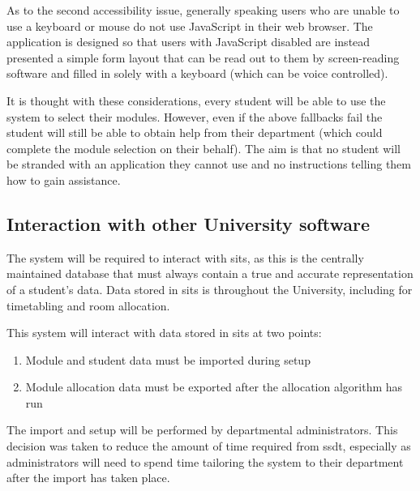 \documentclass[draft]{scrartcl}
\begin{document}

As to the second accessibility issue, generally speaking users who are unable
to use a keyboard or mouse do not use JavaScript in their web browser. The
application is designed so that users with JavaScript disabled are instead
presented a simple form layout that can be read out to them by screen-reading
software and filled in solely with a keyboard (which can be voice controlled).

It is thought with these considerations, every student will be able to use the
system to select their modules. However, even if the above fallbacks fail the
student will still be able to obtain help from their department (which could
complete the module selection on their behalf). The aim is that no student
will be stranded with an application they cannot use and no instructions
telling them how to gain assistance.


\subsection{Interaction with other University software}

The system will be required to interact with \gls{sits}, as this is the
centrally maintained database that must always contain a true and accurate
representation of a student's data. Data stored in \gls{sits} is throughout
the University, including for timetabling and room allocation.

This system will interact with data stored in \gls{sits} at two points:

\begin{enumerate}
  \item Module and student data must be imported during setup
  \item Module allocation data must be exported after the allocation algorithm has run
\end{enumerate}

The import and setup will be performed by departmental administrators. This
decision was taken to reduce the amount of time required from \gls{ssdt},
especially as administrators will need to spend time tailoring the system to
their department after the import has taken place.
\end{document}
